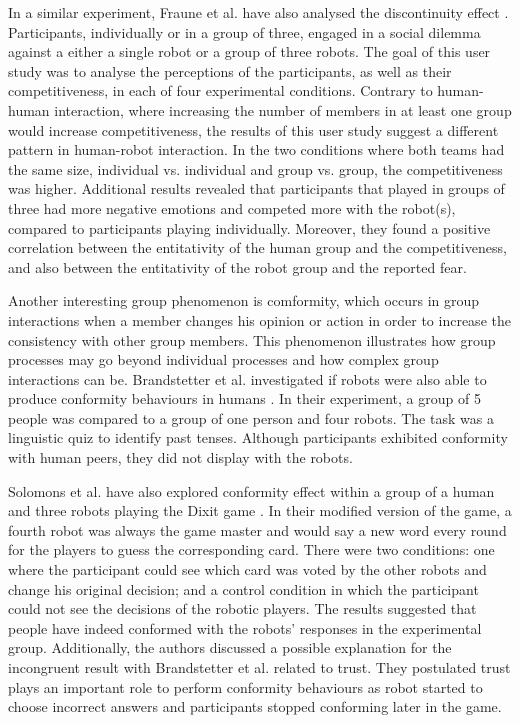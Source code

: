 In a similar experiment, Fraune et al. have also analysed the discontinuity effect \cite{fraune2019human}. Participants, individually or in a group of three, engaged in a social dilemma against a either a single robot or a group of three robots. The goal of this user study was to analyse the perceptions of the participants, as well as their competitiveness, in each of four experimental conditions. Contrary to human-human interaction, where increasing the number of members in at least one group would increase competitiveness, the results of this user study suggest a different pattern in human-robot interaction. In the two conditions where both teams had the same size, individual vs. individual and group vs. group, the competitiveness was higher. Additional results revealed that participants that played in groups of three had more negative emotions and competed more with the robot(s), compared to participants playing individually. Moreover, they found a positive correlation between the entitativity of the human group and the competitiveness, and also between the entitativity of the robot group and the reported fear.

Another interesting group phenomenon is comformity, which occurs in group interactions when a member changes his opinion or action in order to increase the consistency with other group members. This phenomenon illustrates how group processes may go beyond individual processes and how complex group interactions can be. Brandstetter et al. investigated if robots were also able to produce conformity behaviours in humans \cite{brandstetter2014peer}. In their experiment, a group of 5 people was compared to a group of one person and four robots. The task was a linguistic quiz to identify past tenses. Although participants exhibited conformity with human peers, they did not display with the robots.

Solomons et al. have also explored conformity effect within a group of a human and three robots playing the Dixit game \cite{salomons2018humans}. In their modified version of the game, a fourth robot was always the game master and would say a new word every round for the players to guess the corresponding card. There were two conditions: one where the participant could see which card was voted by the other robots and change his original decision; and a control condition in which the participant could not see the decisions of the robotic players. The results suggested that people have indeed conformed with the robots' responses in the experimental group. Additionally, the authors discussed a possible explanation for the incongruent result with Brandstetter et al. related to trust. They postulated trust plays an important role to perform conformity behaviours as robot started to choose incorrect answers and participants stopped conforming later in the game.

